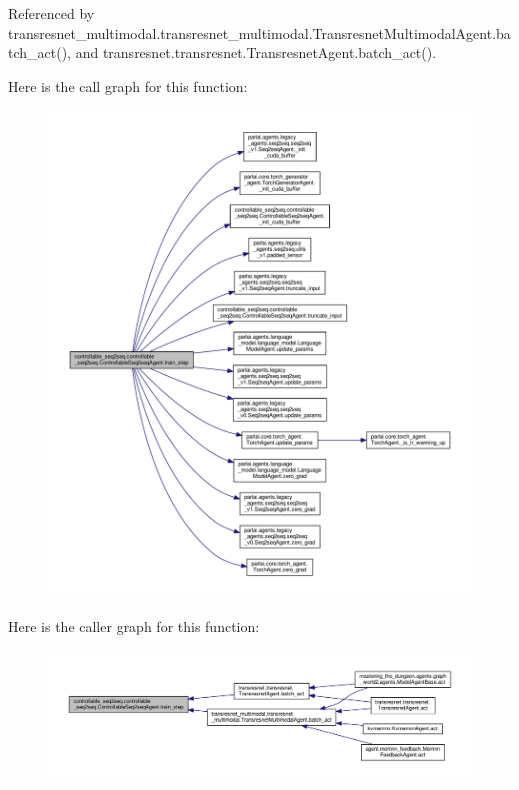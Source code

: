 Referenced by transresnet\+\_\+multimodal.\+transresnet\+\_\+multimodal.\+Transresnet\+Multimodal\+Agent.\+batch\+\_\+act(), and transresnet.\+transresnet.\+Transresnet\+Agent.\+batch\+\_\+act().

Here is the call graph for this function\+:
\nopagebreak
\begin{figure}[H]
\begin{center}
\leavevmode
\includegraphics[width=350pt]{classcontrollable__seq2seq_1_1controllable__seq2seq_1_1ControllableSeq2seqAgent_a88e4d25c8f2eccaf1c7595d40c4f607b_cgraph}
\end{center}
\end{figure}
Here is the caller graph for this function\+:
\nopagebreak
\begin{figure}[H]
\begin{center}
\leavevmode
\includegraphics[width=350pt]{classcontrollable__seq2seq_1_1controllable__seq2seq_1_1ControllableSeq2seqAgent_a88e4d25c8f2eccaf1c7595d40c4f607b_icgraph}
\end{center}
\end{figure}
